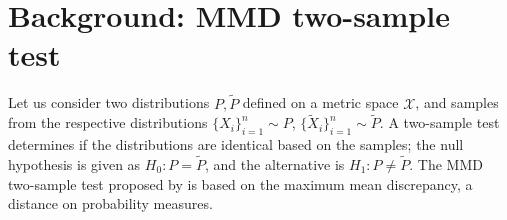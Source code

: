 \section{Background: MMD two-sample test \citep{gretton_kernel_2012}}
Let us consider two distributions $P, \tilde{P}$ defined on a metric space $\mathcal{X}$, and samples from the respective distributions $\{X_i\}_{i=1}^{n}\sim P$,  $\{\tilde{X}_i\}_{i=1}^{n} \sim \tilde{P}$. 
A two-sample test determines if the distributions are identical based on the samples; 
the null hypothesis is given as $H_0: P=\tilde{P}$, and the alternative is $H_1: P\neq \tilde{P}$.
The MMD two-sample test proposed by \cite{gretton_kernel_2012} is based on the maximum mean discrepancy, a distance on probability measures.

